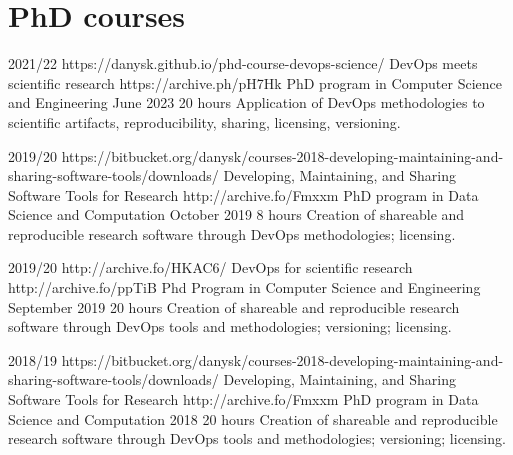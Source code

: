 \section{PhD courses}
\vspace{-2em}
\begin{outerlist}
    \item[2021/22]
        \unibocourse
        {https://danysk.github.io/phd-course-devops-science/}
        {DevOps meets scientific research}
        {https://archive.ph/pH7Hk}
        {PhD program in Computer Science and Engineering }
        {June 2023}
        {20 hours}
        {Application of DevOps methodologies to scientific artifacts, reproducibility, sharing, licensing, versioning.}
    \item[2019/20]
        \unibocourse
        {https://bitbucket.org/danysk/courses-2018-developing-maintaining-and-sharing-software-tools/downloads/}
        {Developing, Maintaining, and Sharing Software Tools for Research}
        {http://archive.fo/Fmxxm}
        {PhD program in Data Science and Computation}
        {October 2019}
        {8 hours}
        {Creation of shareable and reproducible research software through DevOps methodologies; licensing.}
    \item[2019/20]
        \unibocourse
        {http://archive.fo/HKAC6/}
        {DevOps for scientific research}
        {http://archive.fo/ppTiB}
        {Phd Program in Computer Science and Engineering}
        {September 2019}
        {20 hours}
        {Creation of shareable and reproducible research software through DevOps tools and methodologies; versioning; licensing.}
    \item[2018/19]
        \unibocourse
        {https://bitbucket.org/danysk/courses-2018-developing-maintaining-and-sharing-software-tools/downloads/}
        {Developing, Maintaining, and Sharing Software Tools for Research}
        {http://archive.fo/Fmxxm}
        {PhD program in Data Science and Computation}
        {2018}
        {20 hours}
        {Creation of shareable and reproducible research software through DevOps tools and methodologies; versioning; licensing.}
\end{outerlist}

